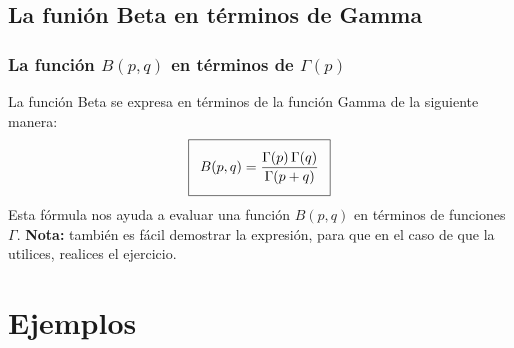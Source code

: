 \subsection{La funión Beta en términos de Gamma}
\begin{frame}
\frametitle{La función $B(p, q)$ en términos de $\Gamma (p)$}
La función Beta se expresa en términos de la función Gamma de la siguiente manera:
\begin{align}
\addtolength{\fboxsep}{5pt}\boxed{B(p, q) = \dfrac{\Gamma(p) \, \Gamma(q)}{\Gamma (p + q)}}
\label{eq:ecuacion_07_01}
\end{align}
Esta fórmula nos ayuda a evaluar una función $B (p, q)$ en términos de funciones $\Gamma$. \textbf{Nota: } también es fácil demostrar la expresión, para que en el caso de que la utilices, realices el ejercicio.
\end{frame}
\section{Ejemplos}
